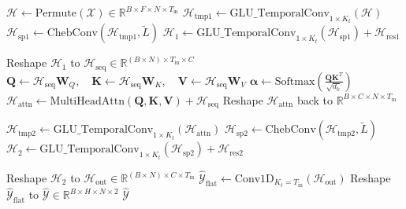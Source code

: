 \documentclass[journal,twocolumn]{IEEEtran}
\begin{document}
\begin{algorithm}[htbp]
\caption{TA-STGCN Forward Pass (Depth=2, Middle Temporal Attention)}
\label{algo:ta_stgcn_forward}
\DontPrintSemicolon
{}
$\mathcal{H} \leftarrow \text{Permute}(\mathcal{X}) \in \mathbb{R}^{B \times F \times N \times T_{\text{in}}}$\;
$\mathcal{H}_{\text{tmp1}} \leftarrow \text{GLU\_TemporalConv}_{1 \times K_t}(\mathcal{H})$ 
$\mathcal{H}_{\text{sp1}} \leftarrow \text{ChebConv}(\mathcal{H}_{\text{tmp1}}, \tilde{L})$ 
$\mathcal{H}_1 \leftarrow \text{GLU\_TemporalConv}_{1 \times K_t}(\mathcal{H}_{\text{sp1}}) + \mathcal{H}_{\text{res1}}$ 

Reshape $\mathcal{H}_1$ to $\mathcal{H}_{\text{seq}} \in \mathbb{R}^{(B \times N) \times T_{\text{in}} \times C}$\;
$\mathbf{Q} \leftarrow \mathcal{H}_{\text{seq}}\mathbf{W}_Q, \quad \mathbf{K} \leftarrow \mathcal{H}_{\text{seq}}\mathbf{W}_K, \quad \mathbf{V} \leftarrow \mathcal{H}_{\text{seq}}\mathbf{W}_V$\;
$\boldsymbol{\alpha} \leftarrow \text{Softmax}\left(\frac{\mathbf{Q}\mathbf{K}^T}{\sqrt{d_k}}\right)$ 
$\mathcal{H}_{\text{attn}} \leftarrow \text{MultiHeadAttn}(\mathbf{Q}, \mathbf{K}, \mathbf{V}) + \mathcal{H}_{\text{seq}}$ 
Reshape $\mathcal{H}_{\text{attn}}$ back to $\mathbb{R}^{B \times C \times N \times T_{\text{in}}}$\;

$\mathcal{H}_{\text{tmp2}} \leftarrow \text{GLU\_TemporalConv}_{1 \times K_t}(\mathcal{H}_{\text{attn}})$ 
$\mathcal{H}_{\text{sp2}} \leftarrow \text{ChebConv}(\mathcal{H}_{\text{tmp2}}, \tilde{L})$ 
$\mathcal{H}_2 \leftarrow \text{GLU\_TemporalConv}_{1 \times K_t}(\mathcal{H}_{\text{sp2}}) + \mathcal{H}_{\text{res2}}$ 

Reshape $\mathcal{H}_2$ to $\mathcal{H}_{\text{out}} \in \mathbb{R}^{(B \times N) \times C \times T_{\text{in}}}$\;
$\hat{\mathcal{Y}}_{\text{flat}} \leftarrow \text{Conv1D}_{K_t=T_{\text{in}}}(\mathcal{H}_{\text{out}})$ 
Reshape $\hat{\mathcal{Y}}_{\text{flat}}$ to $\hat{\mathcal{Y}} \in \mathbb{R}^{B \times H \times N \times 2}$ 
\Return $\hat{\mathcal{Y}}$\;
\end{algorithm}
\end{document}
